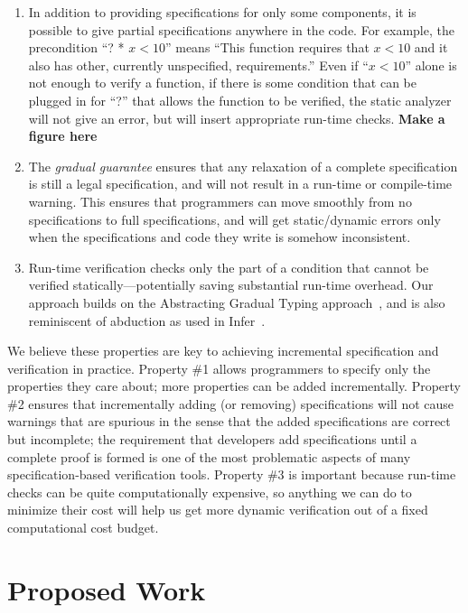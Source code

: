 \documentclass[10pt,twocolumn]{article}
\begin{document}
\begin{sloppypar}
\begin{enumerate}

\item
In addition to providing specifications for only some components, it is possible to give partial specifications anywhere in the code.  For example, the precondition ``? * $x<10$'' means ``This function requires that $x<10$ and it also has other, currently unspecified, requirements.''  Even if ``$x<10$'' alone is not enough to verify a function, if there is some condition that can be plugged in for ``?'' that allows the function to be verified, the static analyzer will not give an error, but will insert appropriate run-time checks.  \textbf{Make a figure here}

\item
The \textit{gradual guarantee} ensures that any relaxation of a complete specification is still a legal specification, and will not result in a run-time or compile-time warning.  This ensures that programmers can move smoothly from no specifications to full specifications, and will get static/dynamic errors only when the specifications and code they write is somehow inconsistent.

\item
Run-time verification checks only the part of a condition that cannot be verified statically—potentially saving substantial run-time overhead.  Our approach builds on the Abstracting Gradual Typing approach~\cite{garcia2016abstracting}, and is also reminiscent of abduction as used in Infer~\cite{Infer}.

\end{enumerate}

We believe these properties are key to achieving incremental specification and verification in practice.  Property \#1 allows programmers to specify only the properties they care about; more properties can be added incrementally.  Property \#2 ensures that incrementally adding (or removing) specifications will not cause warnings that are spurious in the sense that the added specifications are correct but incomplete; the requirement that developers add specifications until a complete proof is formed is one of the most problematic aspects of many specification-based verification tools.  Property \#3 is important because run-time checks can be quite computationally expensive, so anything we can do to minimize their cost will help us get more dynamic verification out of a fixed computational cost budget.


\section{Proposed Work}


\end{sloppypar}
\end{document}
